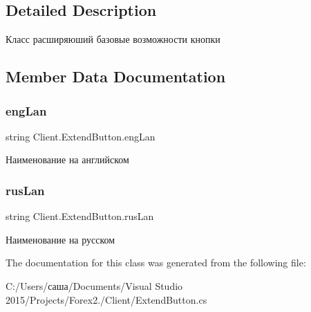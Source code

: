 \subsection{Detailed Description}
Класс расширяюший базовые возможности кнопки 



\subsection{Member Data Documentation}
\hypertarget{class_client_1_1_extend_button_aaa4299e5b2843a9fddaced18352c44a4}{}\label{class_client_1_1_extend_button_aaa4299e5b2843a9fddaced18352c44a4} 
\subsubsection{\texorpdfstring{eng\+Lan}{engLan}}
{\footnotesize\ttfamily string Client.\+Extend\+Button.\+eng\+Lan}



Наименование на английском 

\hypertarget{class_client_1_1_extend_button_a980571f04f44336a1fb9f662a79f760f}{}\label{class_client_1_1_extend_button_a980571f04f44336a1fb9f662a79f760f} 
\subsubsection{\texorpdfstring{rus\+Lan}{rusLan}}
{\footnotesize\ttfamily string Client.\+Extend\+Button.\+rus\+Lan}



Наименование на русском 



The documentation for this class was generated from the following file\+:\begin{DoxyCompactItemize}
\item 
C\+:/\+Users/саша/\+Documents/\+Visual Studio 2015/\+Projects/\+Forex2./\+Client/Extend\+Button.\+cs\end{DoxyCompactItemize}
